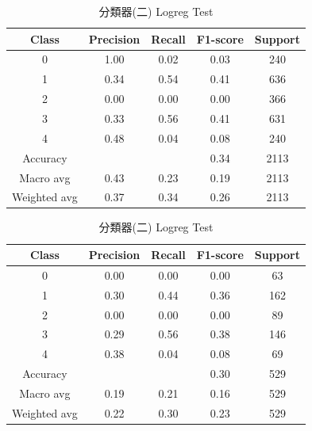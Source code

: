 \begin{enumerate}
\begin{enumerate}
                \begin{table}[H]
                \centering
                \scriptsize
                \begin{minipage}{0.48\textwidth}
                \centering
                \begin{tabular}{c|cccc}
                \hline
                Class & Precision & Recall & F1-score & Support \\
                \hline
                0 & 1.00 & 0.02 & 0.03 & 240 \\
                1 & 0.34 & 0.54 & 0.41 & 636 \\
                2 & 0.00 & 0.00 & 0.00 & 366 \\
                3 & 0.33 & 0.56 & 0.41 & 631 \\
                4 & 0.48 & 0.04 & 0.08 & 240 \\
                \hline
                Accuracy &       &      & 0.34 & 2113 \\
                Macro avg & 0.43 & 0.23 & 0.19 & 2113 \\
                Weighted avg & 0.37 & 0.34 & 0.26 & 2113 \\
                \hline
                \end{tabular}
                \caption{分類器(二) Logreg Train}
                \label{tab:classifier_2_report_train_sgd_logreg_filtered}
                \end{minipage}%
                \hfill
                \begin{minipage}{0.48\textwidth}
                \centering
                \begin{tabular}{c|cccc}
                \hline
                Class & Precision & Recall & F1-score & Support \\
                \hline
                0 & 0.00 & 0.00 & 0.00 & 63 \\
                1 & 0.30 & 0.44 & 0.36 & 162 \\
                2 & 0.00 & 0.00 & 0.00 & 89 \\
                3 & 0.29 & 0.56 & 0.38 & 146 \\
                4 & 0.38 & 0.04 & 0.08 & 69 \\
                \hline
                Accuracy &       &      & 0.30 & 529 \\
                Macro avg & 0.19 & 0.21 & 0.16 & 529 \\
                Weighted avg & 0.22 & 0.30 & 0.23 & 529 \\
                \hline
                \end{tabular}
                \caption{分類器(二) Logreg Test}
                \label{tab:classifier_2_report_test_sgd_logreg_filtered}
                \end{minipage}
                \end{table}


\end{enumerate}
\end{enumerate}
